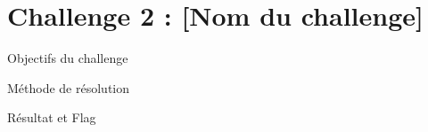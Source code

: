 
\section{Challenge 2 : [Nom du challenge]}

\begin{frame}{Objectifs du challenge}
\end{frame}

\begin{frame}{Méthode de résolution}
\end{frame}

\begin{frame}{Résultat et Flag}
\end{frame}